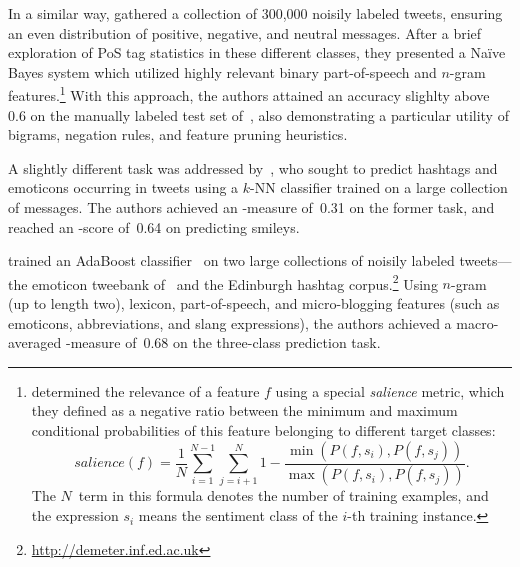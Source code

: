 In a similar way, \citet{Pak:10} gathered a collection of 300,000
noisily labeled tweets, ensuring an even distribution of positive,
negative, and neutral messages.  After a brief exploration of PoS tag
statistics in these different classes, they presented a Na{\"i}ve
Bayes system which utilized highly relevant binary part-of-speech and
$n$-gram features.\footnote{\citet{Pak:10} determined the relevance of
  a feature $f$ using a special \emph{salience} metric, which they
  defined as a negative ratio between the minimum and maximum
  conditional probabilities of this feature belonging to different
  target classes:
  \begin{equation*}
    salience(f) = \frac{1}{N}\sum_{i=1}^{N-1}\sum_{j=i+1}^N 1 - \frac{\min(P(f, s_i), P(f, s_j))}{\max(P(f, s_i), P(f, s_j))}.
  \end{equation*}
  The $N$~term in this formula denotes the number of training
  examples, and the expression $s_i$ means the sentiment class of the
  $i$-th training instance.} With this approach, the authors attained
an accuracy slighlty above 0.6 on the manually labeled test set
of~\citet{Go:09}, also demonstrating a particular utility of bigrams,
negation rules, and feature pruning heuristics.

A slightly different task was addressed by~\citet{Davidov:10}, who
sought to predict hashtags and emoticons occurring in tweets using a
$k$-NN classifier trained on a large collection of messages.  The
authors achieved an \F-measure of~0.31 on the former task, and reached
an \F-score of~0.64 on predicting smileys.

\citet{Kouloumpis:11} trained an AdaBoost
classifier~\cite{Schapire:00} on two large collections of noisily
labeled tweets---the emoticon tweebank of~\citet{Go:09} and the
Edinburgh hashtag corpus.\footnote{\url{http://demeter.inf.ed.ac.uk}}
Using $n$-gram (up to length two), lexicon, part-of-speech, and
micro-blogging features (such as emoticons, abbreviations, and slang
expressions), the authors achieved a macro-averaged \F-measure of~0.68
on the three-class prediction task.


